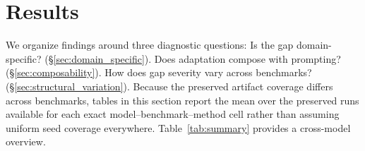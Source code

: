 \section{Results}
\label{sec:results}

We organize findings around three diagnostic questions: Is the gap domain-specific? (\S\ref{sec:domain_specific}). Does adaptation compose with prompting? (\S\ref{sec:composability}). How does gap severity vary across benchmarks? (\S\ref{sec:structural_variation}).
Because the preserved artifact coverage differs across benchmarks, tables in this section report the mean over the preserved runs available for each exact model--benchmark--method cell rather than assuming uniform seed coverage everywhere.
Table~\ref{tab:summary} provides a cross-model overview.

